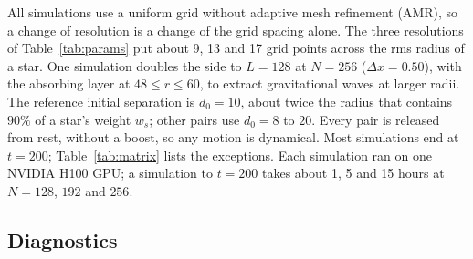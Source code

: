 \documentclass[twocolumn,floatfix,aps,prd,superscriptaddress,nofootinbib]{revtex4-2}
\begin{document}
All simulations use a uniform grid without adaptive mesh refinement (AMR), so a change of resolution is a change of the grid spacing alone. The three resolutions of Table~\ref{tab:params} put about 9, 13 and 17 grid points across the rms radius of a star. One simulation doubles the side to $L=128$ at $N=256$ ($\Delta x=0.50$), with the absorbing layer at $48\le r\le60$, to extract gravitational waves at larger radii. The reference initial separation is $d_0=10$, about twice the radius that contains $90\%$ of a star's weight $w_s$; other pairs use $d_0=8$ to $20$. Every pair is released from rest, without a boost, so any motion is dynamical. Most simulations end at $t=200$; Table~\ref{tab:matrix} lists the exceptions. Each simulation ran on one NVIDIA H100 GPU; a simulation to $t=200$ takes about 1, 5 and 15 hours at $N=128$, $192$ and $256$.

\subsection{Diagnostics}
\end{document}
